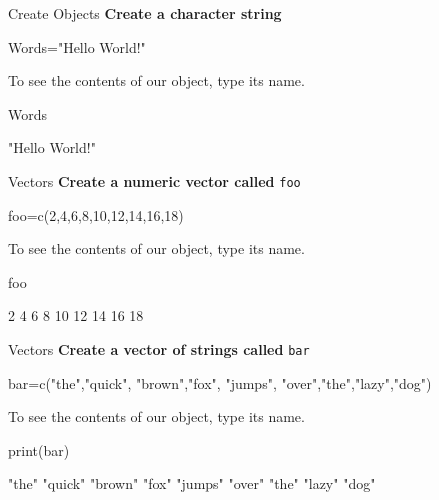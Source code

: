 \documentclass{beamer}\usepackage[]{graphicx}\usepackage[]{color}
\begin{document}
\begin{frame}[fragile]{Create Objects}
  \textbf{Create a character string}
\begin{Schunk}
\begin{Sinput}
Words="Hello World!"
\end{Sinput}
\end{Schunk}
To see the contents of our object, type its name.
\begin{Schunk}
\begin{Sinput}
Words
\end{Sinput}
\begin{Soutput}
[1] "Hello World!"
\end{Soutput}
\end{Schunk}
\end{frame}

\begin{frame}[fragile]{Vectors}
  \textbf{Create a numeric vector called} \texttt{foo}
\begin{Schunk}
\begin{Sinput}
foo=c(2,4,6,8,10,12,14,16,18)
\end{Sinput}
\end{Schunk}
To see the contents of our object, type its name.
\begin{Schunk}
\begin{Sinput}
foo
\end{Sinput}
\begin{Soutput}
[1]  2  4  6  8 10 12 14 16 18
\end{Soutput}
\end{Schunk}
\end{frame}

\begin{frame}[fragile]{Vectors}
  \textbf{Create a vector of strings called} \texttt{bar}
\begin{Schunk}
\begin{Sinput}
bar=c("the","quick", "brown","fox", "jumps",
"over","the","lazy","dog")
\end{Sinput}
\end{Schunk}
To see the contents of our object, type its name.
\begin{Schunk}
\begin{Sinput}
print(bar)
\end{Sinput}
\begin{Soutput}
[1] "the"   "quick" "brown" "fox"   "jumps" "over"  "the"   "lazy"  "dog"  
\end{Soutput}
\end{Schunk}
\end{frame}
\end{document}
